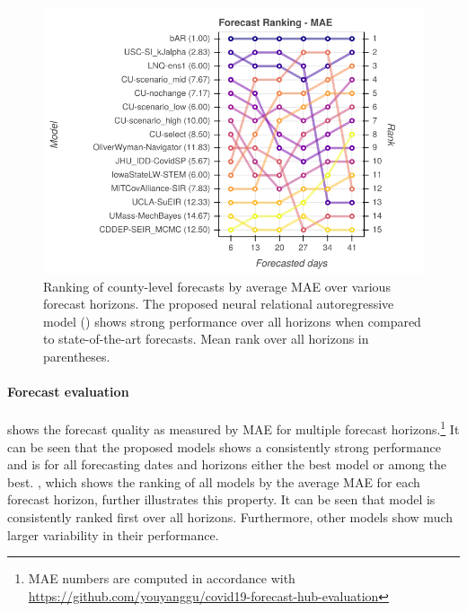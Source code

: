 \begin{figure}[t]
  \centering
  \includegraphics[width=\columnwidth]{img/us_rank_mae.png}
  \vspace{-2ex}
\caption{Ranking of county-level forecasts by average MAE over various forecast horizons. The proposed neural relational autoregressive model (\bAR) shows strong performance over all horizons when compared to state-of-the-art forecasts. Mean rank over all horizons in parentheses.}
\label{fig:ranking-covidhub-mae}
\end{figure}



\paragraph{Forecast evaluation}  shows the forecast
quality as measured by MAE for multiple forecast horizons.\footnote{MAE numbers are computed in accordance with \url{https://github.com/youyanggu/covid19-forecast-hub-evaluation}} It can be seen that
the proposed \bAR models shows a consistently strong performance and is for all
forecasting dates and horizons either the best model or among the best.
, which shows the ranking of all models by the
average MAE for each forecast horizon, further illustrates this property. It can
be seen that \bAR model is consistently ranked first over all horizons.
Furthermore, other models show much larger variability in their performance.


